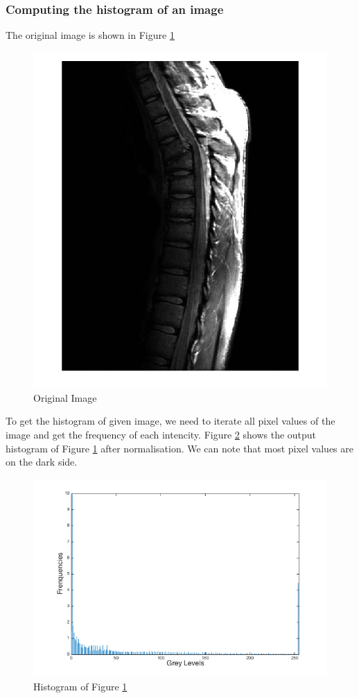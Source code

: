 \subsubsection{Computing the histogram of an image}
The original image is shown in Figure \ref{fig:hisoriginal}
\begin{figure}[h]
	\centering
	\includegraphics[scale=0.2]{0308}
	\caption{Original Image}
	\label{fig:hisoriginal}
\end{figure}
To get the histogram of given image, we need to iterate all pixel values of the image and get the frequency of each intencity. Figure \ref{fig:hishist1} shows the output histogram of Figure \ref{fig:hisoriginal} after normalisation. We can note that most pixel values are on the dark side.
\begin{figure}[h]
	\centering
	\includegraphics[scale=0.4]{historg}
	\caption{Histogram of Figure \ref{fig:hisoriginal}}
	\label{fig:hishist1}
\end{figure}
